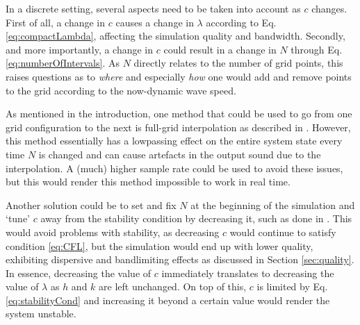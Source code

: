 
%
%
In a discrete setting, several aspects need to be taken into account as $c$ changes. First of all, a change in $c$ causes a change in $\lambda$ according to Eq. \eqref{eq:compactLambda}, affecting the simulation quality and bandwidth. Secondly, and more importantly, a change in $c$ could result in a change in $N$ through Eq. \eqref{eq:numberOfIntervals}. As $N$ directly relates to the number of grid points, this raises questions as to \textit{where} and especially \textit{how} one would add and remove points to the grid according to the now-dynamic wave speed.

As mentioned in the introduction, one method that could be used to go from one grid configuration to the next is full-grid interpolation as described in \cite[Chap. 5]{bilbao2009}. However, this method essentially has a lowpassing effect on the entire system state every time $N$ is changed and can cause artefacts in the output sound due to the interpolation. A (much) higher sample rate could be used to avoid these issues, but this would render this method impossible to work in real time.

Another solution could be to set and fix $N$ at the beginning of the simulation and `tune' $c$ away from the stability condition by decreasing it, such as done in \cite{Willemsen2019}. This would avoid problems with stability, as decreasing $c$ would continue to satisfy condition \eqref{eq:CFL}, but the simulation would end up with lower quality, exhibiting dispersive and bandlimiting effects as discussed in Section \ref{sec:quality}. In essence, decreasing the value of $c$ immediately translates to decreasing the value of $\lambda$ as $h$ and $k$ are left unchanged. On top of this, $c$ is limited by Eq. \eqref{eq:stabilityCond} and increasing it beyond a certain value would render the system unstable.

